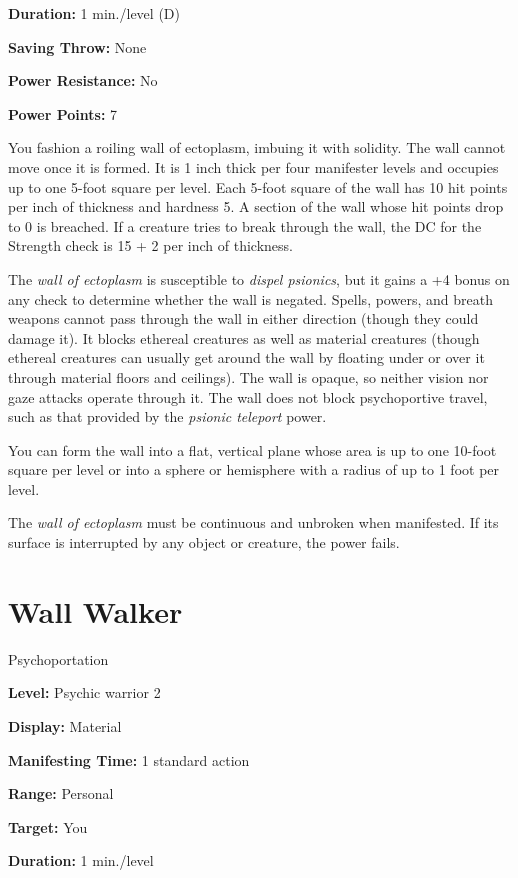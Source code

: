 \documentclass{article}
\begin{document}
\textbf{Duration:} 1 min./level (D)

\textbf{Saving Throw:} None

\textbf{Power Resistance:} No

\textbf{Power Points:} 7

You fashion a roiling wall of ectoplasm, imbuing it with solidity. The wall cannot 
move once it is formed. It is 1 inch thick per four manifester levels and occupies 
up to one 5-foot square per level. Each 5-foot square of the wall has 10 hit points 
per inch of thickness and hardness 5. A section of the wall whose hit points drop 
to 0 is breached. If a creature tries to break through the wall, the DC for the 
Strength check is 15 + 2 per inch of thickness.

The \textit{wall of ectoplasm }is susceptible to \textit{dispel psionics}, but 
it gains a +4 bonus on any check to determine whether the wall is negated. Spells, 
powers, and breath weapons cannot pass through the wall in either direction (though 
they could damage it). It blocks ethereal creatures as well as material creatures 
(though ethereal creatures can usually get around the wall by floating under or 
over it through material floors and ceilings). The wall is opaque, so neither vision 
nor gaze attacks operate through it. The wall does not block psychoportive travel, 
such as that provided by the \textit{psionic teleport }power.

You can form the wall into a flat, vertical plane whose area is up to one 10-foot 
square per level or into a sphere or hemisphere with a radius of up to 1 foot per 
level.

The \textit{wall of ectoplasm }must be continuous and unbroken when manifested. 
If its surface is interrupted by any object or creature, the power fails.

\vspace{12pt}
\section*{Wall Walker}

Psychoportation

\textbf{Level:} Psychic warrior 2

\textbf{Display:} Material

\textbf{Manifesting Time:} 1 standard action

\textbf{Range:} Personal

\textbf{Target:} You

\textbf{Duration:} 1 min./level
\end{document}
